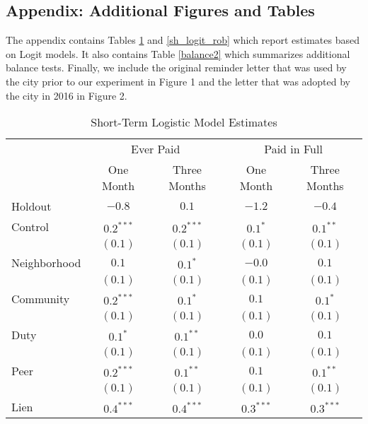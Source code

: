 \documentclass[12pt]{article}
\begin{document}
\begin{appendix}

\section{Appendix: Additional Figures and Tables}

The appendix contains Tables \ref{sh_logit} and \ref{sh_logit_rob}
which report estimates based on Logit models.  It also contains Table
\ref{balance2} which summarizes additional balance tests. Finally, we
include the original reminder letter that was used by the city prior
to our experiment in Figure 1 and the letter that was adopted by the
city in 2016 in Figure 2.



\begin{table}[htb]
\caption{Short-Term Logistic Model Estimates}\label{sh_logit}
\begin{center}
\begin{tabular}{l c c c c }
\hline
 & \multicolumn{2}{c}{Ever Paid} & \multicolumn{2}{c}{Paid in Full} \\
 & One Month & Three Months & One Month & Three Months \\
Holdout        & $-0.8$ & $0.1$       & $-1.2$ & $-0.4$ \\
\hline
Control        & $0.2^{***}$  & $0.2^{***}$ & $0.1^{*}$    & $0.1^{**}$   \\
               & $(0.1)$      & $(0.1)$     & $(0.1)$      & $(0.1)$      \\
Neighborhood   & $0.1$        & $0.1^{*}$   & $-0.0$       & $0.1$        \\
               & $(0.1)$      & $(0.1)$     & $(0.1)$      & $(0.1)$      \\
Community      & $0.2^{***}$  & $0.1^{*}$   & $0.1$        & $0.1^{*}$    \\
               & $(0.1)$      & $(0.1)$     & $(0.1)$      & $(0.1)$      \\
Duty           & $0.1^{*}$    & $0.1^{**}$  & $0.0$        & $0.1$        \\
               & $(0.1)$      & $(0.1)$     & $(0.1)$      & $(0.1)$      \\
Peer           & $0.2^{***}$  & $0.1^{**}$  & $0.1$        & $0.1^{**}$   \\
               & $(0.1)$      & $(0.1)$     & $(0.1)$      & $(0.1)$      \\
Lien           & $0.4^{***}$  & $0.4^{***}$ & $0.3^{***}$  & $0.3^{***}$  \\

\end{tabular}
\end{center}
\end{table}
\end{appendix}
\end{document}
